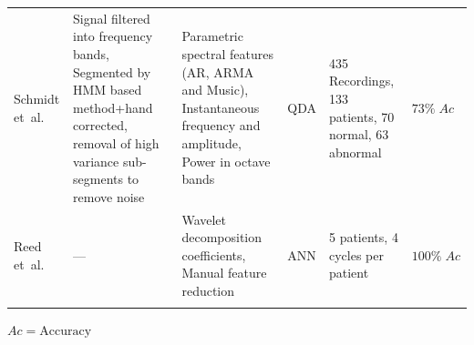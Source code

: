 \documentclass[titlepage, 12pt]{scrartcl} \usepackage{enumitem}
\newcommand{\dbottomrule}{\specialrule{1pt}{0pt}{1.4pt}%
            \specialrule{1pt}{0pt}{\belowrulesep}%
            }
\begin{document}
\begin{landscape}
\begin{table}[htbp]
\begin{tabulary}{\linewidth}{LLLLLL}
Schmidt et~al. \citeyearpar{Schmidt2015}          & Signal filtered into frequency bands, Segmented by HMM based method+hand corrected, removal of high variance sub-segments to remove noise & Parametric spectral features (AR, ARMA and Music), Instantaneous frequency and amplitude, Power in octave bands & QDA                   & 435 Recordings, 133 patients, 70 normal, 63 abnormal                                                                    & $73\%\;Ac$                                         \\
Reed et~al. \citeyearpar{Reed2004}             & ---                                                                                                                                       & Wavelet decomposition coefficients, Manual feature reduction                                                    & ANN                   & 5 patients, 4 cycles per patient                                                                                        & $100\%\;Ac$                                        \\
\dbottomrule\\
\end{tabulary}
$Ac = \text{Accuracy}$
\end{table}
\end{landscape}
\restoregeometry
\end{document}
